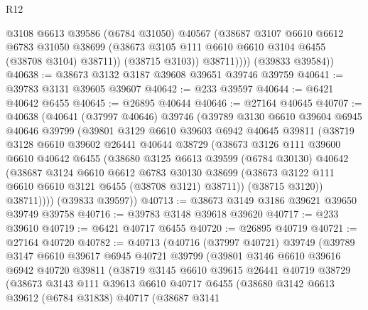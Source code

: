 \begin{lexlean}{R12}
\begin{coremodule}
                @3108
                @6613
                @39586
                (@6784 @31050)
                @40567
                (@38687
                  @3107
                  @6610
                  @6612
                  @6783
                  @31050
                  @38699
                  (@38673 @3105 @111 @6610 @6610 @3104 @6455 (@38708 @3104) @38711))
                (@38715 @3103))
              @38711))))
      (@39833 @39584))
@40638 := @38673 @3132 @3187 @39608 @39651 @39746 @39759
@40641 := @39783 @3131 @39605 @39607
@40642 := @233 @39597
@40644 := @6421 @40642 @6455
@40645 := @26895 @40644
@40646 := @27164 @40645
@40707 := @40638
    (@40641
      (@37997 @40646)
      @39746
      (@39789
        @3130
        @6610
        @39604
        @6945
        @40646
        @39799
        (@39801
          @3129
          @6610
          @39603
          @6942
          @40645
          @39811
          (@38719
            @3128
            @6610
            @39602
            @26441
            @40644
            @38729
            (@38673
              @3126
              @111
              @39600
              @6610
              @40642
              @6455
              (@38680
                @3125
                @6613
                @39599
                (@6784 @30130)
                @40642
                (@38687
                  @3124
                  @6610
                  @6612
                  @6783
                  @30130
                  @38699
                  (@38673 @3122 @111 @6610 @6610 @3121 @6455 (@38708 @3121) @38711))
                (@38715 @3120))
              @38711))))
      (@39833 @39597))
@40713 := @38673 @3149 @3186 @39621 @39650 @39749 @39758
@40716 := @39783 @3148 @39618 @39620
@40717 := @233 @39610
@40719 := @6421 @40717 @6455
@40720 := @26895 @40719
@40721 := @27164 @40720
@40782 := @40713
    (@40716
      (@37997 @40721)
      @39749
      (@39789
        @3147
        @6610
        @39617
        @6945
        @40721
        @39799
        (@39801
          @3146
          @6610
          @39616
          @6942
          @40720
          @39811
          (@38719
            @3145
            @6610
            @39615
            @26441
            @40719
            @38729
            (@38673
              @3143
              @111
              @39613
              @6610
              @40717
              @6455
              (@38680
                @3142
                @6613
                @39612
                (@6784 @31838)
                @40717
                (@38687
                  @3141

\end{coremodule}
\end{lexlean}
